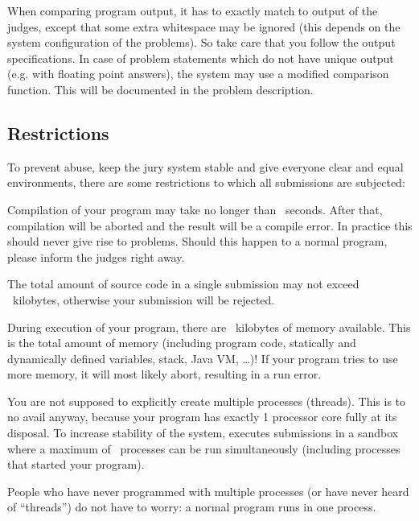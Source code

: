When comparing program output, it has to exactly match to output of
the judges, except that some extra whitespace may be ignored (this
depends on the system configuration of the problems). So take care
that you follow the output specifications. In case of problem
statements which do not have unique output (e.g. with floating point
answers), the system may use a modified comparison function.
This will be documented in the problem description.

\subsection{Restrictions}\label{runlimits}

To prevent abuse, keep the jury system stable and give everyone
clear and equal environments, there are some restrictions to which all
submissions are subjected:

\begin{description}
\item[compile time]
Compilation of your program may take no longer than \COMPILETIME\
seconds. After that, compilation will be aborted and the result will
be a compile error. In practice this should never give rise to
problems. Should this happen to a normal program, please inform the
judges right away.

\item[source size]
The total amount of source code in a single submission may not exceed
\SOURCESIZE\ kilobytes, otherwise your submission will be rejected.

\item[memory]
During execution of your program, there are \MEMLIMIT\ kilobytes of
memory available. This is the total amount of memory (including
program code, statically and dynamically defined variables, stack,
Java VM, \dots)! If your program tries to use more memory, it will
most likely abort, resulting in a run error.

\item[number of processes]
You are not supposed to explicitly create multiple processes (threads). This is
to no avail anyway, because your program has exactly 1 processor core fully
at its disposal. To increase stability of the system, \DOMjudge
executes submissions in a sandbox where a maximum of \PROCLIMIT\ processes
can be run simultaneously (including processes that started your program).

People who have never programmed with multiple processes (or have
never heard of ``threads'') do not have to worry: a normal program
runs in one process.

\end{description}


